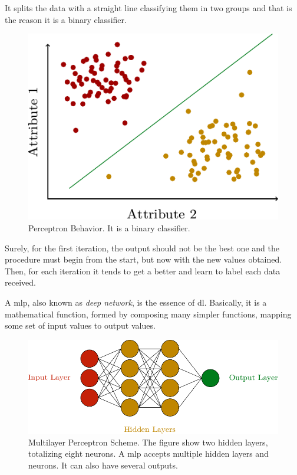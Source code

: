 It splits the data with a straight line classifying them in two groups and that is the reason it is a binary classifier.

\begin{figure}
    \centering
    \includegraphics{figures/2methodology/nn/perceptron_charge.pdf}
    \caption[Perceptron Behavior]{Perceptron Behavior. It is a binary classifier.}
\end{figure}

Surely, for the first iteration, the output should not be the best one and the procedure must begin from the start, but now with the new values obtained. Then, for each iteration it tends to get a better and learn to label each data received.
 
A \gls*{mlp}, also known as \emph{deep network}, is the essence of \gls*{dl}. Basically, it is a mathematical function, formed by composing many simpler functions, mapping some set of input values to output values.
%
\begin{figure}
    \centering
    \includegraphics{figures/2methodology/nn/mlp.pdf}
    \caption[Multilayer Perceptron Scheme]{Multilayer Perceptron Scheme. The figure show two hidden layers, totalizing eight neurons. A \gls*{mlp} accepts multiple hidden layers and neurons. It can also have several outputs.}
\end{figure}